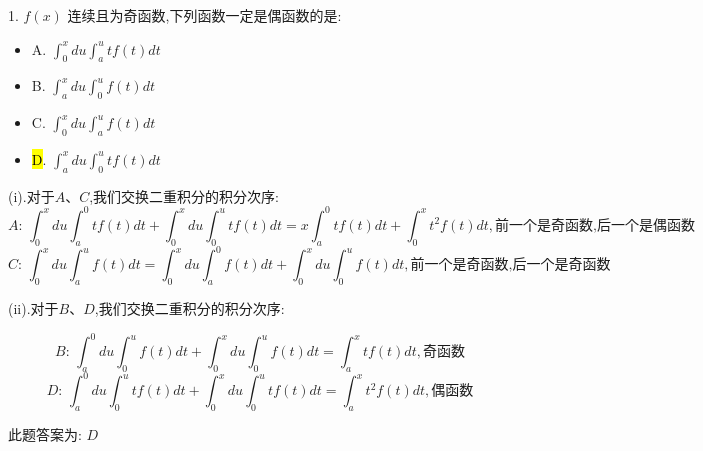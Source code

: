 1. $f(x)$ 连续且为奇函数,下列函数一定是偶函数的是: 
\begin{itemize}
	\item A. $\int_{0}^{x}du\int_{a}^{u}tf(t)dt$ 
	\item B. $\int_{a}^{x}du\int_{0}^{u}f(t)dt$ 
	\item C. $\int_{0}^{x}du\int_{a}^{u}f(t)dt$ 
	\item \hl{D}. $\int_{a}^{x}du\int_{0}^{u}tf(t)dt$ 
\end{itemize}
\begin{solution}
	
	(i).对于$A\text{、}C$,我们交换二重积分的积分次序: 
	$$A\text{: }\int_{0}^{x}du\int_{a}^{0}tf(t)dt+\int_{0}^{x}du\int_{0}^{u}tf(t)dt=x\int_{a}^{0}tf(t)dt+\int_{0}^{x}t^2f(t)dt,\text{前一个是奇函数,后一个是偶函数}$$
	$$C\text{: }\int_{0}^{x}du\int_{a}^{u}f(t)dt=\int_{0}^{x}du\int_{a}^{0}f(t)dt+\int_{0}^{x}du\int_{0}^{u}f(t)dt,\text{前一个是奇函数,后一个是奇函数}$$
	
	(ii).对于$B\text{、}D$,我们交换二重积分的积分次序: 
	
	$$B\text{: }\int_{a}^{0}du\int_{0}^{u}f(t)dt+\int_{0}^{x}du\int_{0}^{u}f(t)dt=\int_{a}^{x}tf(t)dt,\text{奇函数}$$
	$$D\text{: }\int_{a}^{0}du\int_{0}^{u}tf(t)dt+\int_{0}^{x}du\int_{0}^{u}tf(t)dt=\int_{a}^{x}t^2f(t)dt,\text{偶函数}$$
	
	此题答案为: $D$
\end{solution}


